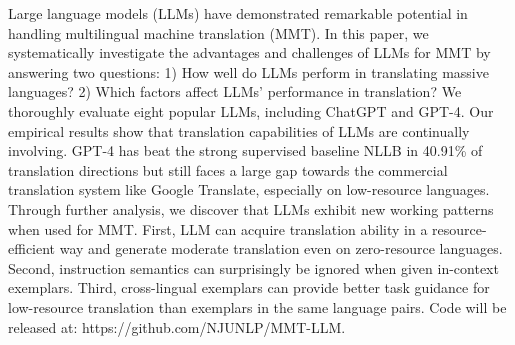 Large language models (LLMs) have demonstrated remarkable potential in handling multilingual machine translation (MMT). In this paper, we systematically investigate the advantages and challenges of LLMs for MMT by answering two questions: 1) How well do LLMs perform in translating massive languages? 2) Which factors affect LLMs' performance in translation? We thoroughly evaluate eight popular LLMs, including ChatGPT and GPT-4. Our empirical results show that translation capabilities of LLMs are continually involving. GPT-4 has beat the strong supervised baseline NLLB in 40.91\% of translation directions but still faces a large gap towards the commercial translation system like Google Translate, especially on low-resource languages. Through further analysis, we discover that LLMs exhibit new working patterns when used for MMT. First, LLM can acquire translation ability in a resource-efficient way and generate moderate translation even on zero-resource languages. Second, instruction semantics can surprisingly be ignored when given in-context exemplars. Third, cross-lingual exemplars can provide better task guidance for low-resource translation than exemplars in the same language pairs. Code will be released at: https://github.com/NJUNLP/MMT-LLM.